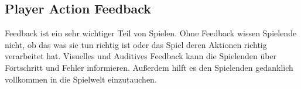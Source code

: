 \subsection{Player Action Feedback\label{_feedback}}

Feedback ist ein sehr wichtiger Teil von Spielen. Ohne Feedback wissen Spielende nicht, ob das was sie tun richtig ist oder das Spiel deren Aktionen richtig verarbeitet hat. Visuelles und Auditives Feedback kann die Spielenden über Fortschritt und Fehler informieren. Außerdem hilft es den Spielenden gedanklich vollkommen in die Spielwelt einzutauchen.